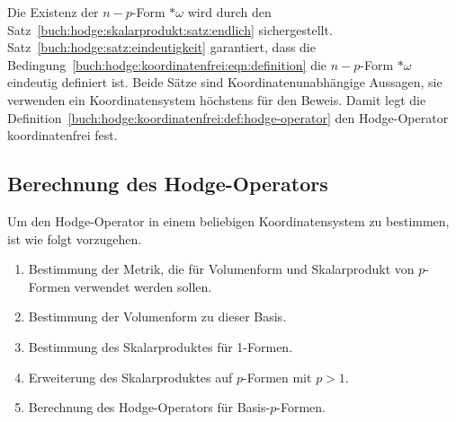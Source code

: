 Die Existenz der $n-p$-Form $\ast\omega$ wird durch den
Satz~\ref{buch:hodge:skalarprodukt:satz:endlich} sichergestellt.
Satz~\ref{buch:hodge:satz:eindeutigkeit} garantiert, dass die
Bedingung~\eqref{buch:hodge:koordinatenfrei:eqn:definition}
die $n-p$-Form $\ast\omega$ eindeutig definiert ist.
Beide Sätze sind Koordinatenunabhängige Aussagen, sie verwenden
ein Koordinatensystem höchstens für den Beweis.
Damit legt die
Definition~\ref{buch:hodge:koordinatenfrei:def:hodge-operator}
den Hodge-Operator koordinatenfrei fest.

%
%
\subsection{Berechnung des Hodge-Operators}
Um den Hodge-Operator in einem beliebigen Koordinatensystem zu
bestimmen, ist wie folgt vorzugehen.
\begin{enumerate}
\item
Bestimmung der Metrik, die für Volumenform und Skalarprodukt
von $p$-Formen verwendet werden sollen.
\item
Bestimmung der Volumenform zu dieser Basis.
\item
Bestimmung des Skalarproduktes für 1-Formen.
\item
Erweiterung des Skalarproduktes auf $p$-Formen mit $p>1$.
\item
Berechnung des Hodge-Operators für Basis-$p$-Formen.
\end{enumerate}

%
%
